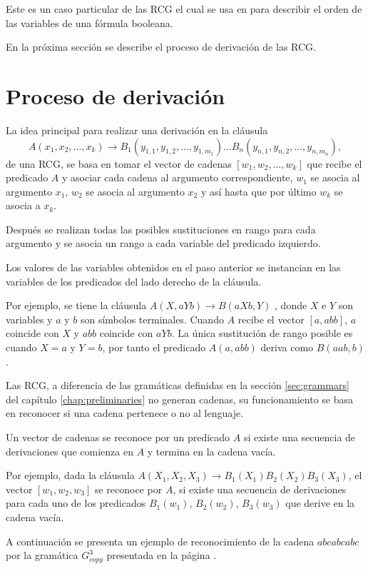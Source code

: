 Este es un caso particular de las RCG el cual se usa en \cite{aSRCSAT} para describir el orden de las variables de una fórmula booleana.

En la próxima sección se describe el proceso de derivación de las RCG.

\section{Proceso de derivación}

La idea principal para realizar una derivación en la cláusula 
\[
    A(x_1, x_2, \ldots, x_k) \to B_1(y_{1,1}, y_{1,2}, \ldots, y_{1,m_1}) \ldots B_n(y_{n,1}, y_{n,2}, \ldots, y_{n,m_n}),
\]
de una RCG, se basa en tomar el vector de cadenas $[w_1, w_2,\ldots, w_k]$ que recibe el predicado $A$ y asociar cada cadena al argumento 
correspondiente, $w_1$ se asocia al argumento $x_1$, $w_2$ se asocia al argumento $x_2$ y así hasta que por último
$w_k$ se asocia a $x_k$. 

Después se realizan todas las posibles sustituciones en rango para cada argumento y se asocia un rango a 
cada variable del predicado izquierdo.

Los valores de las variables obtenidos en el paso anterior se instancian en las variables de los predicados del lado derecho de la cláusula.

Por ejemplo, se tiene la cláusula $A(X,aYb)\to B(aXb,Y)$ , donde $X$ e $Y$ son variables y $a$ y $b$ son símbolos 
terminales. Cuando $A$ recibe el vector $[a,abb]$, $a$ coincide con $X$ y $abb$ coincide con $aYb$. La única sustitución de 
rango posible es cuando $X=a$ y $Y=b$, por tanto el predicado $A(a,abb)$ deriva como $B(aab,b)$.

Las RCG, a diferencia de las gramáticas definidas en la sección \ref{sec:grammars} del capítulo \ref{chap:preliminaries} no generan cadenas, su funcionamiento se basa en reconocer si una cadena pertenece o no al lenguaje.

Un vector de cadenas se reconoce por un predicado $A$ si existe una secuencia de derivaciones que comienza en $A$ y termina en la cadena vacía.

Por ejemplo, dada la cláusula $A(X_1,X_2,X_3)\to B_1(X_1)B_2(X_2)B_3(X_3)$, el vector $[w_1,w_2,w_3]$ se reconoce por $A$, si existe una secuencia de derivaciones para cada uno de los predicados $B_1(w_1)$, $B_2(w_2)$, $B_3(w_3)$ que derive en la cadena vacía.

A continuación se presenta un ejemplo de reconocimiento de la cadena $abcabcabc$ por la gramática $G^3_{copy}$
presentada en la página \pageref{g_3copy}.

